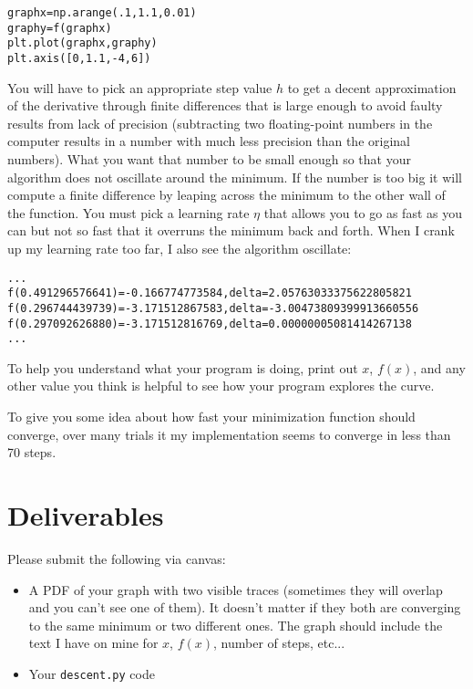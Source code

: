 \begin{fullwidth}
\begin{alltt}
graphx = np.arange(.1,1.1,0.01)
graphy = f(graphx)
plt.plot(graphx,graphy)
plt.axis([0,1.1,-4,6])
\end{alltt}

You will have to pick an appropriate step value $h$ to get a decent approximation of the derivative through finite differences that is large enough to avoid faulty results from lack of precision (subtracting two floating-point numbers in the computer results in a number with much less precision than the original numbers). What you want that number to be small enough so that your algorithm does not oscillate around the minimum. If the number is too big it will compute a finite difference by leaping across the minimum to the other wall of the function. You must pick a learning rate $\eta$ that allows you to go as fast as you can but not so fast that it overruns the minimum back and forth. When I crank up my learning rate too far, I also see the algorithm oscillate:

\begin{alltt}
...
f(0.491296576641) = -0.166774773584 , delta = 2.05763033375622805821
f(0.296744439739) = -3.171512867583 , delta = -3.00473809399913660556
f(0.297092626880) = -3.171512816769 , delta = 0.00000005081414267138
...
\end{alltt}

To help you understand what your program is doing, print out $x$, $f(x)$, and any other value you think is helpful to see how your program explores the curve.

To give you some idea about  how fast your minimization function should converge, over many trials it my implementation seems to converge in less than 70 steps.
 
\section{Deliverables}

Please submit the following via canvas:
 
\begin{itemize}
\item A PDF of your graph with two visible traces (sometimes they will overlap and you can't see one of them).  It doesn't matter if they both are converging to the same minimum or two different ones. The graph should include the text I have on mine for $x$, $f(x)$, number of steps, etc...
\item Your {\tt descent.py} code
\end{itemize}

\end{fullwidth}


